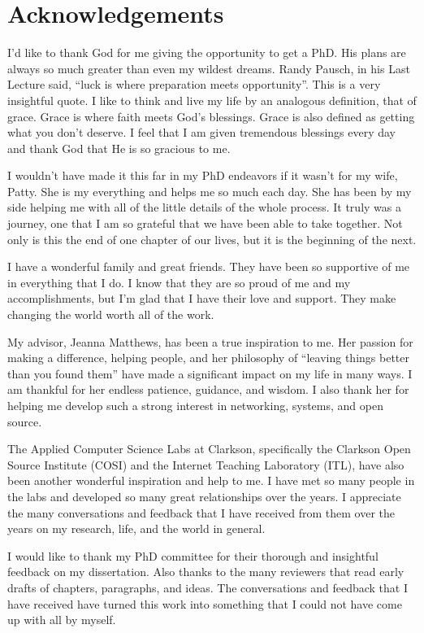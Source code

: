 
\section*{Acknowledgements}

I'd like to thank God for me giving the opportunity to get a PhD. His plans are always so much greater than even my wildest dreams. Randy Pausch, in his Last Lecture said, ``luck is where preparation meets opportunity''. This is a very insightful quote. I like to think and live my life by an  analogous definition, that of grace. Grace is where faith meets God's blessings. Grace is also defined as getting what you don't deserve. I feel that I am given tremendous blessings every day and thank God that He is so gracious to me.

I wouldn't have made it this far in my PhD endeavors if it wasn't for my wife, Patty. She is my everything and helps me so much each day. She has been by my side helping me with all of the little details of the whole process. It truly was a journey, one that I am so grateful that we have been able to take together. Not only is this the end of one chapter of our lives, but it is the beginning of the next.

I have a wonderful family and great friends. They have been so supportive of me in everything that I do. I know that they are so proud of me and my accomplishments, but I'm glad that I have their love and support. They make changing the world worth all of the work. 

My advisor, Jeanna Matthews, has been a true inspiration to me. Her passion for making a difference, helping people, and  her philosophy of ``leaving things better than you found them'' have made a significant impact on my life in many ways. I am thankful for her endless patience, guidance, and wisdom. I also thank her for helping me develop such a strong interest in networking, systems, and open source.

The Applied Computer Science Labs at Clarkson, specifically the Clarkson Open Source Institute (COSI) and the Internet Teaching Laboratory (ITL), have also been another wonderful inspiration and help to me. I have met so many people in the labs and developed so many great relationships over the years. I appreciate the many conversations and feedback that I have received from them over the years on my research, life, and the world in general.

I would like to thank my PhD committee for their thorough and insightful feedback on my dissertation. Also thanks to the many reviewers that read early drafts of chapters, paragraphs, and ideas. The conversations and feedback that I have received have turned this work into something that I could not have come up with all by myself.

